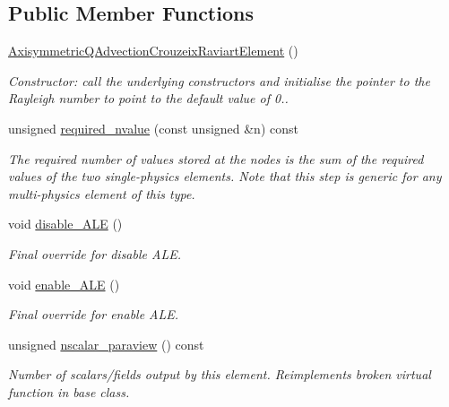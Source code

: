 \subsection*{Public Member Functions}
\begin{DoxyCompactItemize}
\item 
\hyperlink{classoomph_1_1AxisymmetricQAdvectionCrouzeixRaviartElement_af4d272a08506d3a47aff330fb57948bb}{Axisymmetric\+Q\+Advection\+Crouzeix\+Raviart\+Element} ()
\begin{DoxyCompactList}\small\item\em Constructor\+: call the underlying constructors and initialise the pointer to the Rayleigh number to point to the default value of 0.. \end{DoxyCompactList}\item 
unsigned \hyperlink{classoomph_1_1AxisymmetricQAdvectionCrouzeixRaviartElement_a3f287fb65ae8fa74e83d664585473a6f}{required\+\_\+nvalue} (const unsigned \&n) const
\begin{DoxyCompactList}\small\item\em The required number of values stored at the nodes is the sum of the required values of the two single-\/physics elements. Note that this step is generic for any multi-\/physics element of this type. \end{DoxyCompactList}\item 
void \hyperlink{classoomph_1_1AxisymmetricQAdvectionCrouzeixRaviartElement_a76e076f86d043ccd40e033af12bd150b}{disable\+\_\+\+A\+LE} ()
\begin{DoxyCompactList}\small\item\em Final override for disable A\+LE. \end{DoxyCompactList}\item 
void \hyperlink{classoomph_1_1AxisymmetricQAdvectionCrouzeixRaviartElement_ab217eb1240bf8cf33910565aed05c7dd}{enable\+\_\+\+A\+LE} ()
\begin{DoxyCompactList}\small\item\em Final override for enable A\+LE. \end{DoxyCompactList}\item 
unsigned \hyperlink{classoomph_1_1AxisymmetricQAdvectionCrouzeixRaviartElement_af9076e11220b7139f35651d99b1544d3}{nscalar\+\_\+paraview} () const
\begin{DoxyCompactList}\small\item\em Number of scalars/fields output by this element. Reimplements broken virtual function in base class. \end{DoxyCompactList}\item 

\end{DoxyCompactItemize}
